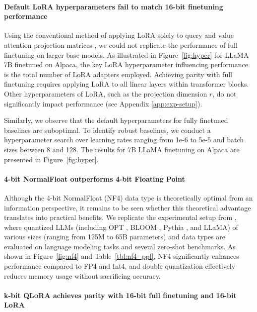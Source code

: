 \paragraph{Default LoRA hyperparameters fail to match 16-bit finetuning performance} 

Using the conventional method of applying LoRA solely to query and value attention projection matrices \citep{hu2021lora}, we could not replicate the performance of full finetuning on larger base models. As illustrated in Figure~\ref{fig:hyper} for LLaMA 7B finetuned on Alpaca, the key LoRA hyperparameter influencing performance is the total number of LoRA adapters employed. Achieving parity with full finetuning requires applying LoRA to all linear layers within transformer blocks. Other hyperparameters of LoRA, such as the projection dimension $r$, do not significantly impact performance (see Appendix \ref{app:exp-setup}).

Similarly, we observe that the default hyperparameters for fully finetuned baselines are suboptimal. To identify robust baselines, we conduct a hyperparameter search over learning rates ranging from 1e-6 to 5e-5 and batch sizes between 8 and 128. The results for 7B LLaMA finetuning on Alpaca are presented in Figure~\ref{fig:hyper}.

\paragraph{4-bit NormalFloat outperforms 4-bit Floating Point}

Although the 4-bit NormalFloat (NF4) data type is theoretically optimal from an information perspective, it remains to be seen whether this theoretical advantage translates into practical benefits. We replicate the experimental setup from \citet{dettmers2022case}, where quantized LLMs (including OPT \citep{zhang2022opt}, BLOOM \cite{scao2022bloom}, Pythia \cite{biderman2023pythia}, and LLaMA) of various sizes (ranging from 125M to 65B parameters) and data types are evaluated on language modeling tasks and several zero-shot benchmarks. As shown in Figure~\ref{fig:nf4} and Table~\ref{tbl:nf4_ppl}, NF4 significantly enhances performance compared to FP4 and Int4, and double quantization effectively reduces memory usage without sacrificing accuracy.

\paragraph{k-bit \textsc{QLoRA} achieves parity with 16-bit full finetuning and 16-bit LoRA}

